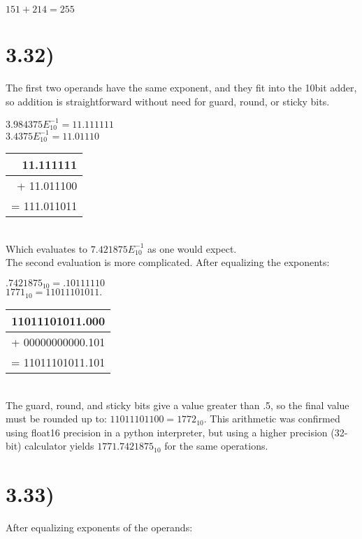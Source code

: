 \documentclass[a4paper,11pt]{article}
\begin{document}
$151+214=255$


\section*{3.32)} 
The first two operands have the same exponent, and they fit into the 10bit adder, so addition is straightforward without need for guard, round, or sticky bits.

\noindent $ 3.984375E^{-1}_{10} = 11.111111 $ \\
$ 3.4375E^{-1}_{10} = 11.01110$ \\

\begin{tabular}{ r   }	
   11.111111 \\
  \hline
  + 11.011100 \\
  \hline
  \hline
  = 111.011011\\
\end{tabular} \\

\noindent Which evaluates to $7.421875E^{-1}_{10}$ as one would expect.  \\

\noindent The second evaluation is more complicated.  After equalizing the exponents:

\noindent $ .7421875_{10} = .10111110$ \\
$ 1771_{10} = 11011101011. $ \\

\begin{tabular}{ r   }	
   11011101011.000 \\
  \hline
  + 00000000000.101 \\
  \hline
  \hline
  = 11011101011.101\\
\end{tabular} \\

\noindent The guard, round, and sticky bits give a value greater than .5, so the final value must be rounded up to: $11011101100 = 1772_{10}.$  This arithmetic was confirmed using float16 precision in a python interpreter, but using a higher precision (32-bit) calculator yields $1771.7421875_{10}$ for the same operations.


\section*{3.33)} 
After equalizing exponents of the operands:
\end{document}
